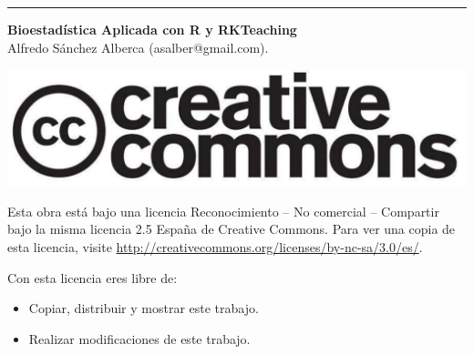 \begin{titlepage}
\null
\vfill
\hrule depth 3pt
\smallskip
\sffamily

\noindent \textbf{Bioestadística Aplicada con R y RKTeaching}\\
Alfredo Sánchez Alberca (asalber@gmail.com).

\bigskip
\begin{center}
\includegraphics[scale=0.1]{img/cc-logo}
\end{center}

\medskip

\small
Esta obra está bajo una licencia Reconocimiento -- No comercial -- Compartir bajo la misma licencia 2.5 España de Creative Commons.
Para ver una copia de esta licencia, visite \url{http://creativecommons.org/licenses/by-nc-sa/3.0/es/}.

\medskip
Con esta licencia eres libre de:
\begin{itemize}
\item Copiar, distribuir y mostrar este trabajo.
\item Realizar modificaciones de este trabajo.
\end{itemize}


\end{titlepage}
